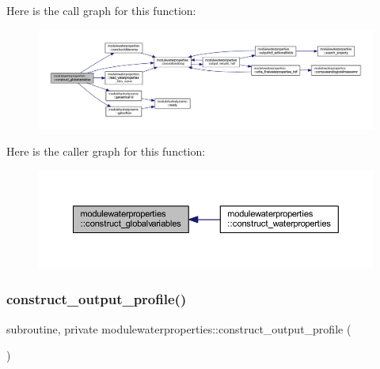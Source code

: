 Here is the call graph for this function\+:\nopagebreak
\begin{figure}[H]
\begin{center}
\leavevmode
\includegraphics[width=350pt]{namespacemodulewaterproperties_a23995dd394222f8d9f2a52604e119d73_cgraph}
\end{center}
\end{figure}
Here is the caller graph for this function\+:\nopagebreak
\begin{figure}[H]
\begin{center}
\leavevmode
\includegraphics[width=350pt]{namespacemodulewaterproperties_a23995dd394222f8d9f2a52604e119d73_icgraph}
\end{center}
\end{figure}
\mbox{\label{namespacemodulewaterproperties_a0df2c60cf00ccbb52f0db0aa65924c93}} 
\subsubsection{\texorpdfstring{construct\+\_\+output\+\_\+profile()}{construct\_output\_profile()}}
{\footnotesize\ttfamily subroutine, private modulewaterproperties\+::construct\+\_\+output\+\_\+profile (\begin{DoxyParamCaption}{ }\end{DoxyParamCaption})\hspace{0.3cm}{\ttfamily [private]}}

